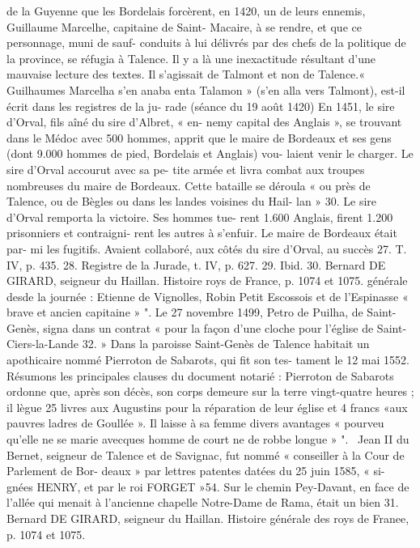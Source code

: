 \documentclass[a4paper,11pt]{book}
\begin{document}
de la Guyenne que les Bordelais forcèrent, en 1420, un de
leurs ennemis, Guillaume Marcelhe, capitaine de Saint-
Macaire, à se rendre, et que ce personnage, muni de sauf-
conduits à lui délivrés par des chefs de la politique de la
province, se réfugia à Talence. Il y a là une inexactitude
résultant d'une mauvaise lecture des textes. Il s'agissait
de Talmont et non de Talence.« Guilhaumes Marcelha s'en anaba enta Talamon » (s'en
alla vers Talmont), est-il écrit dans les registres de la ju-
rade (séance du 19 août 1420)
En 1451, le sire d'Orval, fils aîné du sire d'Albret, « en-
nemy capital des Anglais », se trouvant dans le Médoc avec
500 hommes, apprit que le maire de Bordeaux et ses gens
(dont 9.000 hommes de pied, Bordelais et Anglais) vou-
laient venir le charger. Le sire d'Orval accourut avec sa pe-
tite armée et livra combat aux troupes nombreuses du
maire de Bordeaux. Cette bataille se déroula « ou près de
Talence, ou de Bègles ou dans les landes voisines du Hail-
lan » 30.
Le sire d'Orval remporta la victoire. Ses hommes tue-
rent 1.600 Anglais, firent 1.200 prisonniers et contraigni-
rent les autres à s'enfuir. Le maire de Bordeaux était par-
mi les fugitifs.
Avaient collaboré, aux côtés du sire d'Orval, au succès
27. T. IV, p. 435.
28. Registre de la Jurade, t. IV, p. 627.
29. Ibid.
30. Bernard DE GIRARD, seigneur du Haillan. Histoire
roys de France, p. 1074 et 1075.
générale desde la journée : Etienne de Vignolles, Robin Petit Escossois
et de l'Espinasse « brave et ancien capitaine » ".
Le 27 novembre 1499, Petro de Puilha, de Saint-Genès,
signa dans un contrat « pour la façon d'une cloche pour
l'église de Saint-Ciers-la-Lande 32.
»
Dans la paroisse Saint-Genès de Talence habitait un
apothicaire nommé Pierroton de Sabarots, qui fit son tes-
tament le 12 mai 1552. Résumons les principales clauses
du document notarié :
Pierroton de Sabarots ordonne que, après son décès,
son corps demeure sur la terre vingt-quatre heures ; il
lègue 25 livres aux Augustins pour la réparation de leur
église et 4 francs «aux pauvres ladres de Goullée ». Il
laisse à sa femme divers avantages « pourveu qu'elle ne se
marie avecques homme de court ne de robbe longue » ".
\
Jean II du Bernet, seigneur de Talence et de Savignac,
fut nommé « conseiller à la Cour de Parlement de Bor-
deaux » par lettres patentes datées du 25 juin 1585, « si-
gnées HENRY, et par le roi FORGET »54.
Sur le chemin Pey-Davant, en face de l'allée qui menait
à l'ancienne chapelle Notre-Dame de Rama, était un bien
31. Bernard
DE
GIRARD,
seigneur du Haillan. Histoire générale des
roys de Franee, p. 1074 et 1075.
\end{document}
